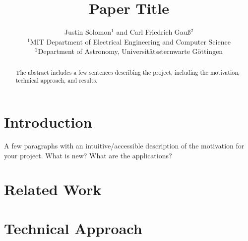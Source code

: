 \documentclass{6838publ}
\title[Shortened title]{Paper Title}
\author[J.\ Solomon \& C.F.\ Gau\ss]
       {Justin Solomon$^1$
        and Carl Friedrich Gau\ss$^{2}$
        \\
         $^1$MIT Department of Electrical Engineering and Computer Science\\
         $^2$Department of Astronomy, Universit\"atssternwarte G\"ottingen
       }
\begin{document}

\maketitle

\begin{abstract}
The abstract includes a few sentences describing the project, including the motivation, technical approach, and results. \lipsum[1]
\end{abstract}

\section{Introduction}

A few paragraphs with an intuitive/accessible description of the motivation for your project.  What is new?  What are the applications?

\section{Related Work}


\cite{alvarez-melisGromovWassersteinAlignmentWord2018}

\section{Technical Approach}\label{sec:technical_approach}
\end{document}
